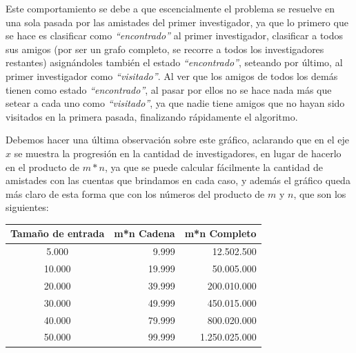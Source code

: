 Este comportamiento se debe a que escencialmente el problema se resuelve en una sola pasada por las amistades del primer investigador, ya que lo primero que se hace es clasificar como \textit{``encontrado''} al primer investigador, clasificar a todos sus amigos (por ser un grafo completo, se recorre a todos los investigadores restantes) asignándoles también el estado \textit{``encontrado''}, seteando por último, al primer investigador como \textit{``visitado''}. Al ver que los amigos de todos los demás tienen como estado \textit{``encontrado''}, al pasar por ellos no se hace nada más que setear a cada uno como \textit{``visitado''}, ya que nadie tiene amigos que no hayan sido visitados en la primera pasada, finalizando rápidamente el algoritmo.

Debemos hacer una última observación sobre este gráfico, aclarando que en el eje $x$ se muestra la progresión en la cantidad de investigadores, en lugar de hacerlo en el producto de $m*n$, ya que se puede calcular fácilmente la cantidad de amistades con las cuentas que brindamos en cada caso, y además el gráfico queda más claro de esta forma que con los números del producto de $m$ y $n$, que son los siguientes:

\begin{center}
\begin{tabular}{|c|r|r|}
  \hline
 \textbf{Tamaño de entrada} & \textbf{m*n Cadena} & \textbf{m*n Completo}   \\
  \hline
  5.000	&	9.999	&	12.502.500 \\
  \hline
  10.000	&	19.999	&	50.005.000\\
  \hline
  20.000	&	39.999	&	200.010.000\\
  \hline
  30.000	&	49.999	&	450.015.000\\
  \hline
  40.000	&	79.999	&	800.020.000\\
  \hline
  50.000	&	99.999	&	1.250.025.000\\
  \hline
\end{tabular}
\end{center}

